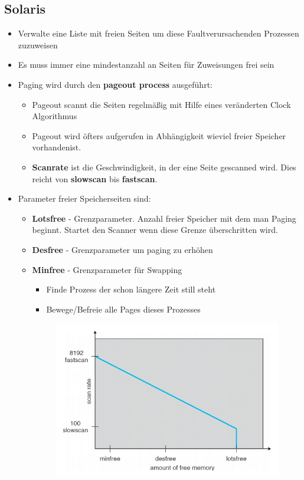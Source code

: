 \documentclass[a4paper]{scrreprt}
\begin{document}
\subsection{Solaris}
\begin{itemize}
\item Verwalte eine Liste mit freien Seiten um diese Faultverursachenden Prozessen zuzuweisen
\item Es muss immer eine mindestanzahl an Seiten für Zuweisungen frei sein
\item Paging wird durch den \textbf{pageout process} ausgeführt:
\begin{itemize}
\item Pageout scannt die Seiten regelmäßig mit Hilfe eines veränderten Clock Algorithmus
\item Pageout wird öfters aufgerufen in Abhängigkeit wieviel freier Speicher vorhandenist.
\item \textbf{Scanrate} ist die Geschwindigkeit, in der eine Seite gescanned wird. Dies reicht von \textbf{slowscan} bis \textbf{fastscan}.
\end{itemize}
\item Parameter freier Speicherseiten sind:
\begin{itemize}
\item \textbf{Lotsfree} - Grenzparameter. Anzahl freier Speicher mit dem man Paging beginnt. Startet den Scanner wenn diese Grenze überschritten wird.
\item \textbf{Desfree} - Grenzparameter um paging zu erhöhen
\item \textbf{Minfree} - Grenzparameter für Swapping
\begin{itemize}
\item Finde Prozess der schon längere Zeit still steht
\item Bewege/Befreie alle Pages dieses Prozesses
\end{itemize}
\begin{figure}[ht]
\centering
\includegraphics[scale=0.5]{graphics/solaris.png}
\end{figure}
\end{itemize}
\end{itemize}
\end{document}
